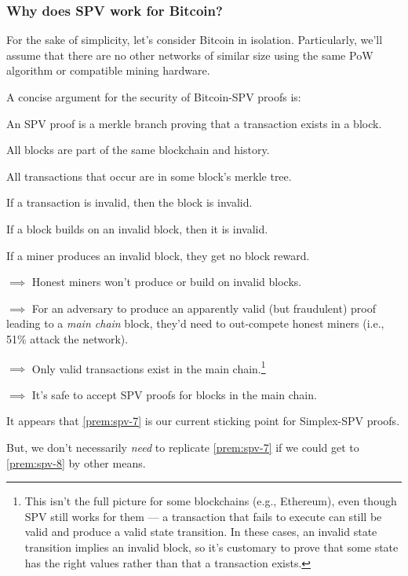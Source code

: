 \subsubsection{Why does SPV work for Bitcoin?}

For the sake of simplicity, let's consider Bitcoin in isolation.
Particularly, we'll assume that there are no other networks of similar size using the same PoW algorithm or compatible mining hardware.

A concise argument for the security of Bitcoin-SPV proofs is:

\begin{argumentslist}
    \item An SPV proof is a merkle branch proving that a transaction exists in a block.
    \item All blocks are part of the same blockchain and history.
    \item All transactions that occur are in some block's merkle tree.
    \item If a transaction is invalid, then the block is invalid.
    \item If a block builds on an invalid block, then it is invalid.
    \item If a miner produces an invalid block, they get no block reward.
    \item $\implies$ Honest miners won't produce or build on invalid blocks.
    \item \label{prem:spv-7} $\implies$ For an adversary to produce an apparently valid (but fraudulent) proof leading to a \emph{main chain} block, they'd need to out-compete honest miners (i.e., 51\% attack the network).
    \item \label{prem:spv-8} $\implies$ Only valid transactions exist in the main chain.\footnote{
        This isn't the full picture for some blockchains (e.g., Ethereum), even though SPV still works for them --- a transaction that fails to execute can still be valid and produce a valid state transition.
        In these cases, an invalid state transition implies an invalid block, so it's customary to prove that some state has the right values rather than that a transaction exists.
    }
    \item $\implies$ It's safe to accept SPV proofs for blocks in the main chain.
\end{argumentslist}

It appears that \cref{prem:spv-7} is our current sticking point for Simplex-SPV proofs.

But, we don't necessarily \emph{need} to replicate \cref{prem:spv-7} if we could get to \cref{prem:spv-8} by other means.

